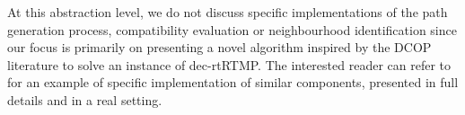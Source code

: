 At this abstraction level, we do not discuss specific implementations of the path generation process, compatibility evaluation or neighbourhood identification since our focus is primarily on presenting a novel algorithm inspired by the DCOP literature to solve an instance of dec-rtRTMP. The interested reader can refer to \cite{DAMATO2024100427} for an example of specific implementation of similar components, presented in full details and in a real setting.

